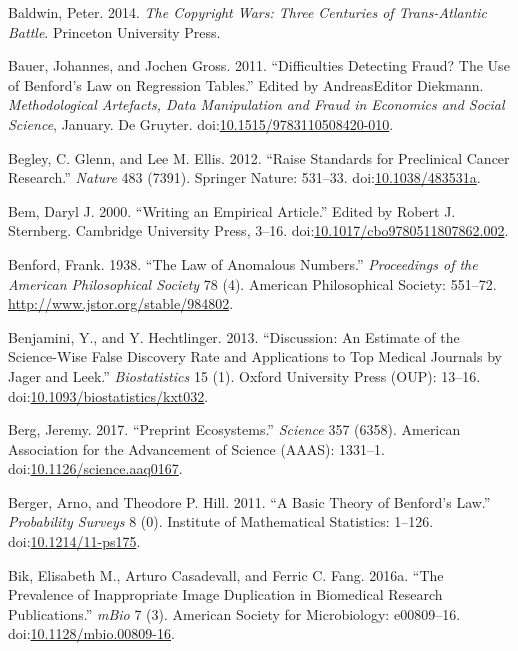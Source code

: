 \documentclass[a5paper]{book}
\begin{document}
\hypertarget{ref-isbn:9781400851911}{}
Baldwin, Peter. 2014. \emph{The Copyright Wars: Three Centuries of
Trans-Atlantic Battle}. Princeton University Press.

\hypertarget{ref-doi:10.1515ux2f9783110508420-010}{}
Bauer, Johannes, and Jochen Gross. 2011. ``Difficulties Detecting Fraud?
The Use of Benford's Law on Regression Tables.'' Edited by AndreasEditor
Diekmann. \emph{Methodological Artefacts, Data Manipulation and Fraud in
Economics and Social Science}, January. De Gruyter.
doi:\href{https://doi.org/10.1515/9783110508420-010}{10.1515/9783110508420-010}.

\hypertarget{ref-doi:10.1038ux2f483531a}{}
Begley, C. Glenn, and Lee M. Ellis. 2012. ``Raise Standards for
Preclinical Cancer Research.'' \emph{Nature} 483 (7391). Springer
Nature: 531--33.
doi:\href{https://doi.org/10.1038/483531a}{10.1038/483531a}.

\hypertarget{ref-doi:10.1017ux2fcbo9780511807862.002}{}
Bem, Daryl J. 2000. ``Writing an Empirical Article.'' Edited by Robert
J. Sternberg. Cambridge University Press, 3--16.
doi:\href{https://doi.org/10.1017/cbo9780511807862.002}{10.1017/cbo9780511807862.002}.

\hypertarget{ref-doi:10.2307ux2f984802}{}
Benford, Frank. 1938. ``The Law of Anomalous Numbers.''
\emph{Proceedings of the American Philosophical Society} 78 (4).
American Philosophical Society: 551--72.
\url{http://www.jstor.org/stable/984802}.

\hypertarget{ref-doi:10.1093ux2fbiostatisticsux2fkxt032}{}
Benjamini, Y., and Y. Hechtlinger. 2013. ``Discussion: An Estimate of
the Science-Wise False Discovery Rate and Applications to Top Medical
Journals by Jager and Leek.'' \emph{Biostatistics} 15 (1). Oxford
University Press (OUP): 13--16.
doi:\href{https://doi.org/10.1093/biostatistics/kxt032}{10.1093/biostatistics/kxt032}.

\hypertarget{ref-doi:10.1126ux2fscience.aaq0167}{}
Berg, Jeremy. 2017. ``Preprint Ecosystems.'' \emph{Science} 357 (6358).
American Association for the Advancement of Science (AAAS): 1331--1.
doi:\href{https://doi.org/10.1126/science.aaq0167}{10.1126/science.aaq0167}.

\hypertarget{ref-doi:10.1214ux2f11-ps175}{}
Berger, Arno, and Theodore P. Hill. 2011. ``A Basic Theory of Benford's
Law.'' \emph{Probability Surveys} 8 (0). Institute of Mathematical
Statistics: 1--126.
doi:\href{https://doi.org/10.1214/11-ps175}{10.1214/11-ps175}.

\hypertarget{ref-doi:10.1128ux2fmbio.00809-16}{}
Bik, Elisabeth M., Arturo Casadevall, and Ferric C. Fang. 2016a. ``The
Prevalence of Inappropriate Image Duplication in Biomedical Research
Publications.'' \emph{mBio} 7 (3). American Society for Microbiology:
e00809--16.
doi:\href{https://doi.org/10.1128/mbio.00809-16}{10.1128/mbio.00809-16}.
\end{document}
